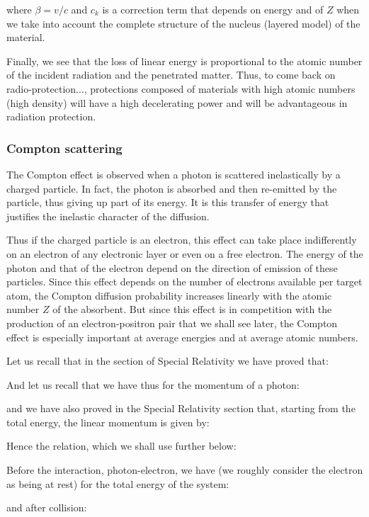 	where $\beta=v/c$ and $c_k$ is a correction term that depends on energy and of $Z$ when we take into account the complete structure of the nucleus (layered model) of the material.

	Finally, we see that the loss of linear energy is proportional to the atomic number of the incident radiation and the penetrated matter. Thus, to come back on radio-protection..., protections composed of materials with high atomic numbers (high density) will have a high decelerating power and will be advantageous in radiation protection.
	
	\subsubsection{Compton scattering}\label{compton scattering}
	The Compton effect is observed when a photon is scattered inelastically by a charged particle. In fact, the photon is absorbed and then re-emitted by the particle, thus giving up part of its energy. It is this transfer of energy that justifies the inelastic character of the diffusion.

	Thus if the charged particle is an electron, this effect can take place indifferently on an electron of any electronic layer or even on a free electron. The energy of the photon and that of the electron depend on the direction of emission of these particles. Since this effect depends on the number of electrons available per target atom, the Compton diffusion probability increases linearly with the atomic number $Z$ of the absorbent. But since this effect is in competition with the production of an electron-positron pair that we shall see later, the Compton effect is especially important at average energies and at average atomic numbers.

	Let us recall that in the section of Special Relativity we have proved that:
	
	And let us recall that we have thus for the momentum of a photon:
	
	and we have also proved in the Special Relativity section that, starting from the total energy, the linear momentum is given by:
	
	Hence the relation, which we shall use further below:
	
	Before the interaction, photon-electron, we have (we roughly consider the electron as being at rest) for the total energy of the system:
	
	and after collision:
	
